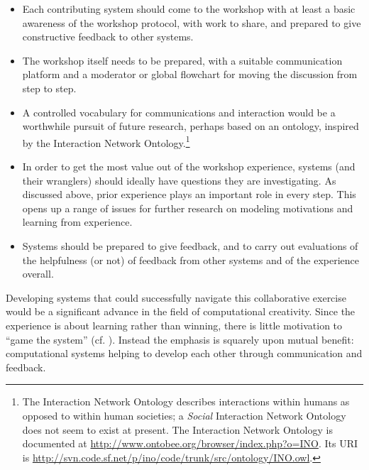 \begin{itemize}
\item Each contributing system should come to the workshop with at
  least a basic awareness of the workshop protocol, with work to
  share, and prepared to give constructive feedback to other systems.
\item The workshop itself needs to be prepared, with a suitable
  communication platform and a moderator or global flowchart for
  moving the discussion from step to step.
 \item A controlled vocabulary for communications and interaction
   would be a worthwhile pursuit of future research, perhaps based on
   an ontology, inspired by the Interaction Network
   Ontology.\footnote{The Interaction Network Ontology describes
     interactions within humans as opposed to within human societies;
     a \emph{Social} Interaction Network Ontology does not seem to
     exist at present.  The Interaction Network Ontology is documented
     at \url{http://www.ontobee.org/browser/index.php?o=INO}.  Its URI
     is
     \url{http://svn.code.sf.net/p/ino/code/trunk/src/ontology/INO.owl}.}
\item In order to get the most value out of the workshop experience,
  systems (and their wranglers) should ideally have questions they are
  investigating.  As discussed above, prior experience plays an
  important role in every step.  This opens up a range of issues for
  further research on modeling motivations and learning from
  experience.
\item Systems should be prepared to give feedback, and to carry out
  evaluations of the helpfulness (or not) of feedback from other
  systems and of the experience overall.
\end{itemize}
  
  Developing systems that could successfully navigate this
  collaborative exercise would be a significant advance in the field
  of computational creativity.  Since the experience is about learning
  rather than winning, there is little motivation to ``game the
  system'' (cf. ). Instead the emphasis is
  squarely upon mutual benefit: computational systems helping to
  develop each other through communication and feedback.
